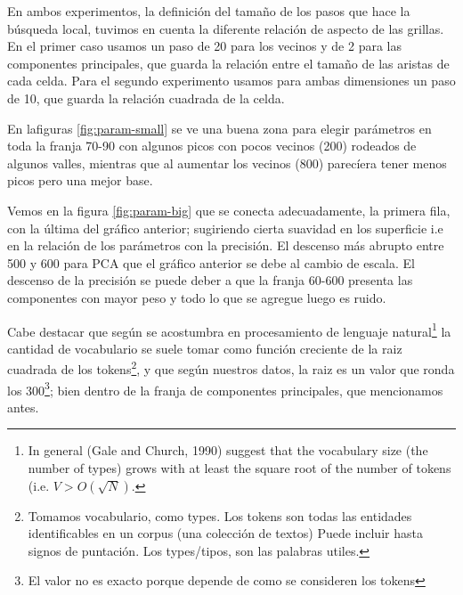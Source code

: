 En ambos experimentos, la definición del tamaño de los pasos que hace
la búsqueda local, tuvimos en cuenta la diferente relación de aspecto
de las grillas. En el primer caso usamos un paso de 20 para los
vecinos y de 2 para las componentes principales, que guarda la
relación entre el tamaño de las aristas de cada celda. Para el segundo
experimento usamos para ambas dimensiones un paso de 10, que guarda la
relación cuadrada de la celda.

En lafiguras \ref{fig:param-small} se ve una buena zona para elegir parámetros en toda la franja 70-90 con algunos picos con pocos vecinos (200) rodeados de algunos valles, mientras que al aumentar los vecinos (800) parecíera tener menos picos pero una mejor base.

Vemos en la figura \ref{fig:param-big} que se conecta adecuadamente,
la primera fila, con la última del gráfico anterior; sugiriendo cierta
suavidad en los superficie i.e en la relación de los parámetros con la
precisión. El descenso más abrupto entre 500 y 600 para PCA que el
gráfico anterior se debe al cambio de escala. El descenso de la
precisión se puede deber a que la franja 60-600 presenta las componentes con mayor peso y todo lo que se agregue luego es ruido.

Cabe destacar que según se acostumbra en procesamiento de
lenguaje\cite{LP} natural\footnote{In general (Gale and Church, 1990)
  suggest that the vocabulary size (the number of types) grows with at
  least the square root of the number of tokens (i.e.
  $V > O(\sqrt{N})$.} la cantidad de vocabulario se suele tomar como
función creciente de la raiz cuadrada de los tokens\footnote{Tomamos
  vocabulario, como types. Los tokens son todas las entidades
  identificables en un corpus (una colección de textos) Puede incluir
  hasta signos de puntación. Los types/tipos, son las palabras
  utiles.}, y que según nuestros datos, la raiz es un valor que ronda
los 300\footnote{El valor no es exacto porque depende de como se
  consideren los tokens}; bien dentro de la franja de componentes
principales, que mencionamos antes.

